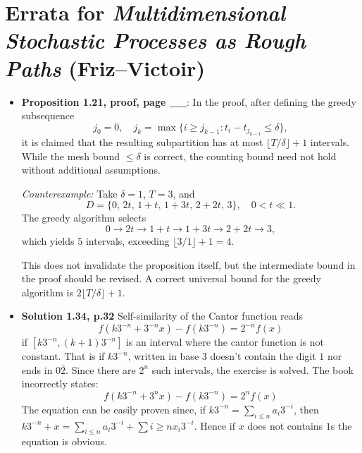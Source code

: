 \documentclass[12pt]{article}
\begin{document}
\section*{Errata for \emph{Multidimensional Stochastic Processes as Rough Paths} (Friz–Victoir)}

\begin{itemize}

\item \textbf{Proposition 1.21, proof, page \_\_}:  
In the proof, after defining the greedy subsequence
\[
j_0 = 0, \quad j_k = \max\{ i \ge j_{k-1} : t_i - t_{j_{k-1}} \le \delta \},
\]
it is claimed that the resulting subpartition has at most $\lfloor T/\delta \rfloor + 1$ intervals.
While the mesh bound $\le \delta$ is correct, the counting bound need not hold without additional assumptions.

\emph{Counterexample:}  
Take $\delta = 1$, $T = 3$, and
\[
D = \{ 0,\, 2t,\, 1+t,\, 1+3t,\, 2+2t,\, 3 \}, \quad 0 < t \ll 1.
\]
The greedy algorithm selects
\[
0 \to 2t \to 1+t \to 1+3t \to 2+2t \to 3,
\]
which yields $5$ intervals, exceeding $\lfloor 3/1 \rfloor + 1 = 4$.

This does not invalidate the proposition itself, but the intermediate bound in the proof should be revised.
A correct universal bound for the greedy algorithm is $2\lfloor T/\delta \rfloor + 1$.

\item \textbf{Solution 1.34, p.32}
Self-similarity of the Cantor function reads
\[
    f(k3^{-n} + 3^{-n} x) - f(k3^{-n}) = 2^{-n} f(x)
\]
if \([k3^{-n}, (k+1)3^{-n}]\) is an interval where the cantor function is not constant.
That is if \(k3^{-n}\), written in base \(3\) doesn't contain the digit \(1\) nor ends in \(0\bar{2}\).
Since there are \(2^n\) such intervals, the exercise is solved.
The book incorrectly states:
\[
    f(k3^{-n} + 3^{n} x) - f(k3^{-n}) = 2^{n} f(x)
\]
The equation can be easily proven since, if \(k 3^{-n} = \sum_{i \le n} a_i 3^{-i} \), then \(k 3^{-n} + x = \sum_{i \le n} a_i 3^{-i} + \sum{i \ge n} x_i 3^{-i} \).
Hence if \(x\) does not contains \(1\)s the equation is obvious.
\end{itemize}
\end{document}
